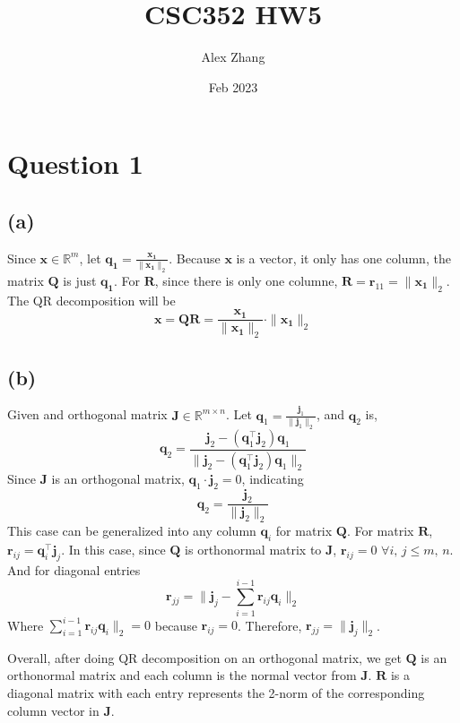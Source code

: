 \documentclass{article}
\title{CSC352 HW5}
\author{Alex Zhang}
\date{Feb 2023}
\newcommand{\mat}[1]{\mathbf{#1}}
\begin{document}
\maketitle

\section*{Question 1}

\subsection*{(a)}
Since $\mat{x} \in \mathbb{R}^m$, let $\mat{q_1} = \frac{\mat{x_1}}{\|\mat{x_1}\|_2}$. Because $\mat{x}$ is a vector, it only has one column, the
matrix $\mat{Q}$ is just $\mat{q_1}$. For $\mat{R}$, since there is only one columne, $\mat{R} = \mat{r}_{11} = \|\mat{x_1} \|_2$. The QR
decomposition will be 
$$\mat{x} = \mat{Q}\mat{R} = \frac{\mat{x_1}}{\|\mat{x_1}\|_2} \cdot  \|\mat{x_1} \|_2$$

\subsection*{(b)}
Given and orthogonal matrix $\mat{J} \in \mathbb{R}^{m \times n}$. Let $\mat{q}_1 = \frac{\mat{j}_1}{\|\mat{j}_1\|_2}$, and $\mat{q}_2$ is,
$$\mat{q}_2= \frac{\mat{j}_2-(\mat{q}_1^\top\mat{j}_2)\mat{q}_1}{\|\mat{j}_2-(\mat{q}_1^\top\mat{j}_2)\mat{q}_1\|_2}$$
Since $\mat{J}$ is an orthogonal matrix, $\mat{q}_1 \cdot \mat{j}_2 = 0$, indicating
$$\mat{q}_2 = \frac{\mat{j}_2}{\|\mat{j}_2\|_2}$$
This case can be generalized into any column $\mat{q}_i$ for matrix $\mat{Q}$. For matrix $\mat{R}$, $\mat{r}_{ij} = \mat{q}_i^\top \mat{j}_j$.
In this case, since $\mat{Q}$ is orthonormal matrix to $\mat{J}$, $\mat{r}_{ij} = 0$ $ \forall i \mbox{, } j \leq m \mbox{, } n$. And for diagonal entries
$$\mat{r}_{jj} = \|\mat{j}_j -\sum^{i-1}_{i=1}\mat{r}_{ij}\mat{q}_i\|_2$$
Where $\sum^{i-1}_{i=1}\mat{r}_{ij}\mat{q}_i\|_2 = 0$ because $\mat{r}_{ij} = 0$. Therefore, $\mat{r}_{jj} = \|\mat{j}_j\|_2$.

Overall, after doing QR decomposition on an orthogonal matrix, we get $\mat{Q}$ is an orthonormal matrix and each column is the normal vector from $\mat{J}$.
$\mat{R}$ is a diagonal matrix with each entry represents the 2-norm of the corresponding column vector in $\mat{J}$.
\end{document}
